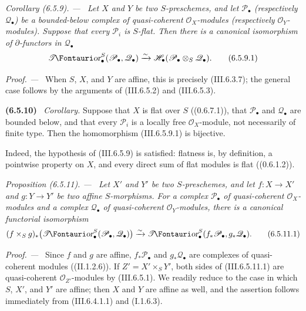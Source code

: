 \documentclass[10pt,oneside]{book}
\newcommand{\sh}[1]{\mathscr{#1}}
\newcommand{\shTor}{\sh{T}\textup{\kern-2.2pt{\Fontauri\slshape or}}}
\newcommand{\sref}[2][]{(#2)}
\newcommand{\oldpage}[2][]{\setcounter{footnote}{0}\marginpar{\scriptsize\textbf{#1}~|~#2}\ignorespaces}
\newenvironment{env}[1][]{\par\medskip\noindent\textbf{(#1)}\ }{\par}
\newenvironment{proposition}[1][]{\par\medskip\noindent\itshape Proposition (#1). ---\ }{\par}
\newenvironment{corollary}[1][]{\par\medskip\noindent\itshape Corollary (#1). ---\ }{\par}
\newenvironment{proof}{\par\medskip\noindent\textit{Proof. ---\ }}{\par}
\begin{document}
\begin{corollary}[6.5.9]
\label{III.6.5.9}
Let $X$ and $Y$ be two $S$-preschemes, and let
$\sh P_\bullet$ (respectively $\sh Q_\bullet$) be a
\oldpage[III]{151}
bounded-below complex of quasi-coherent $\sh O_X$-modules
(respectively $\sh O_Y$-modules).  Suppose that every
$\sh P_i$ is $S$-flat.  Then there is a canonical isomorphism of
$\partial$-functors in $\sh Q_\bullet$
\[
  \shTor_\bullet^S(\sh P_\bullet,\sh Q_\bullet)
  \xrightarrow{\sim}
  \sh H_\bullet(\sh P_\bullet\otimes_S\sh Q_\bullet).
  \tag{6.5.9.1}\label{III.6.5.9.1}
\]
\end{corollary}

\begin{proof}
When $S$, $X$, and $Y$ are affine, this is precisely
\sref{III.6.3.7}; the general case follows by the arguments of
\sref{III.6.5.2} and \sref{III.6.5.3}.
\end{proof}

\begin{env}[6.5.10]
\label{III.6.5.10}
\emph{Corollary.}
Suppose that $X$ is flat over $S$ (\sref[0]{0.6.7.1}), that
$\sh P_\bullet$ and $\sh Q_\bullet$ are bounded below, and that
every $\sh P_i$ is a locally free $\sh O_X$-module, not
necessarily of finite type.  Then the homomorphism
\sref{III.6.5.9.1} is bijective.

Indeed, the hypothesis of \sref{III.6.5.9} is satisfied:
flatness is, by definition, a pointwise property on $X$, and
every direct sum of flat modules is flat (\sref[0]{0.6.1.2}).
\end{env}

\begin{proposition}[6.5.11]
\label{III.6.5.11}
Let $X'$ and $Y'$ be two $S$-preschemes, and let
$f:X\to X'$ and $g:Y\to Y'$ be two affine $S$-morphisms.  For a
complex $\sh P_\bullet$ of quasi-coherent $\sh O_X$-modules and
a complex $\sh Q_\bullet$ of quasi-coherent $\sh O_Y$-modules,
there is a canonical functorial isomorphism
\[
  (f\times_Sg)_*
  \bigl(\shTor_\bullet^S(\sh P_\bullet,\sh Q_\bullet)\bigr)
  \xrightarrow{\sim}
  \shTor_\bullet^S(f_*\sh P_\bullet,g_*\sh Q_\bullet).
  \tag{6.5.11.1}\label{III.6.5.11.1}
\]
\end{proposition}

\begin{proof}
Since $f$ and $g$ are affine, $f_*\sh P_\bullet$ and
$g_*\sh Q_\bullet$ are complexes of quasi-coherent modules
(\sref[II]{II.1.2.6}).  If $Z'=X'\times_SY'$, both sides of
\sref{III.6.5.11.1} are quasi-coherent $\sh O_{Z'}$-modules by
\sref{III.6.5.1}.  We readily reduce to the case in which $S$,
$X'$, and $Y'$ are affine; then $X$ and $Y$ are affine as well,
and the assertion follows immediately from
\sref{III.6.4.1.1} and \sref[I]{I.1.6.3}.
\end{proof}
\end{document}
